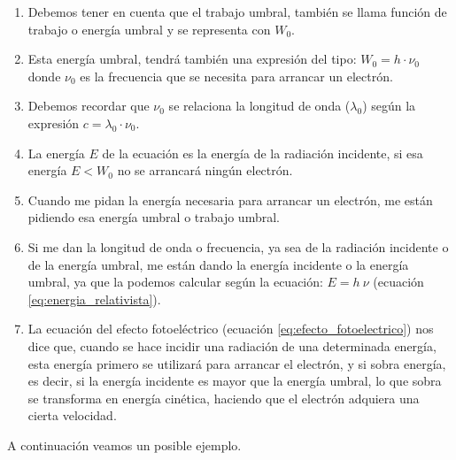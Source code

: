 \begin{consejo}
    \phantom{a}

    \begin{enumerate}
        \item Debemos tener en cuenta que el trabajo umbral, también se llama función de trabajo o energía umbral y se representa con \(W_0\).
        \item Esta energía umbral, tendrá también una expresión del tipo: \(W_0 = h\cdot \nu_0\) donde \(\nu_0\) es la frecuencia que se necesita para arrancar un electrón.
        \item Debemos recordar que \(\nu_0\) se relaciona la longitud de onda (\(\lambda_0\)) según la expresión \(c = \lambda_0 \cdot \nu_0\).
        \item La energía \(E\) de la ecuación es la energía de la radiación incidente, si esa energía \(E < W_0 \) no se arrancará ningún electrón.
        \item Cuando me pidan la energía necesaria para arrancar un electrón, me están pidiendo esa energía umbral o trabajo umbral.
        \item Si me dan la longitud de onda o frecuencia, ya sea de la radiación incidente o de la energía umbral, me están dando la energía incidente o la energía umbral, ya que la podemos calcular según la ecuación: \( E = h\ \nu \) (ecuación \eqref{eq:energia_relativista}).
        \item La ecuación del efecto fotoeléctrico (ecuación \eqref{eq:efecto_fotoelectrico}) nos dice que, cuando se hace incidir una radiación de una determinada energía, esta energía primero se utilizará para arrancar el electrón, y si sobra energía, es decir, si la energía incidente es mayor que la energía umbral, lo que sobra se transforma en energía cinética, haciendo que el electrón adquiera una cierta velocidad.
    \end{enumerate}
\end{consejo}

A continuación veamos un posible ejemplo.

